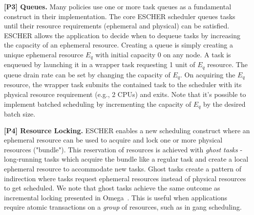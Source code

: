 \textbf{[P3] Queues.}
Many policies \cite{wfq, sfs} use one or more task queues as a fundamental construct in their implementation. 
The core ESCHER scheduler queues tasks until their resource requirements (ephemeral and physical) can be satisfied. ESCHER allows the application to decide when to dequeue tasks by increasing the capacity of an ephemeral resource. 
Creating a queue is simply creating a unique ephemeral resource $E_q$ with initial capacity 0 on any node. A task is enqueued by launching it in a wrapper task requesting 1 unit of $E_q$ resource. The queue drain rate can be set by changing the capacity of $E_q$. On acquiring the $E_q$ resource, the wrapper task submits the contained task to the scheduler with its physical resource requirement (e.g., 2 CPUs) and exits. Note that it's possible to implement batched scheduling %
 by incrementing the capacity of $E_q$ by the desired batch size.

\textbf{[P4] Resource Locking.}
ESCHER enables a new scheduling construct where an ephemeral resource can be used to acquire and lock one or more physical resources ("bundle"). This reservation of resources is achieved with \emph{ghost tasks} - long-running tasks which acquire the bundle like a regular task and create a local ephemeral resource to accommodate new tasks. Ghost tasks create a pattern of indirection where tasks request ephemeral resources instead of physical resources to get scheduled. We note that ghost tasks achieve the same outcome as incremental locking presented in Omega~\cite{omega}. This is useful when applications require atomic transactions on a \emph{group} of resources, such as in gang scheduling.



